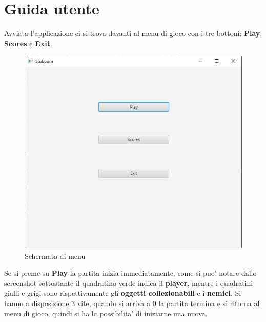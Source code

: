 \documentclass[a4paper,12pt]{report}
\begin{document}
\chapter{Guida utente}

Avviata l'applicazione ci si trova davanti al menu di gioco con i tre bottoni: \textbf{Play}, \textbf{Scores} e \textbf{Exit}.
\begin{figure}[H]
\centering{}
\includegraphics[width=\textwidth,height=\textheight,keepaspectratio]{img/menu.png}
\caption{Schermata di menu}
\label{img:menu}
\end{figure}
Se si preme su \textbf{Play} la partita inizia immediatamente, come si puo' notare dallo screenshot sottostante il quadratino verde indica il \textbf{player}, mentre i quadratini gialli e grigi sono rispettivamente gli \textbf{oggetti collezionabili} e i \textbf{nemici}. Si hanno a disposizione 3 vite, quando si arriva a 0 la partita termina e si ritorna al menu di gioco, quindi si ha la possibilita' di iniziarne una nuova.
\end{document}

